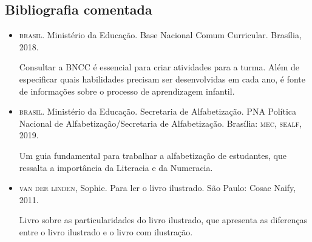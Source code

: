 \documentclass[11pt]{extarticle}
\begin{document}
\subsection{Bibliografia comentada}

\begin{itemize}
\item \textsc{brasil}. Ministério da Educação. Base Nacional Comum Curricular. Brasília, 2018.

Consultar a \textsc{BNCC} é essencial para criar atividades para a turma. Além de especificar 
quais habilidades precisam ser desenvolvidas em cada ano, é fonte de informações sobre 
o processo de aprendizagem infantil. 
 
\item \textsc{brasil}. Ministério da Educação. Secretaria de Alfabetização. PNA Política Nacional de Alfabetização/Secretaria 
de Alfabetização. Brasília: \textsc{mec, sealf}, 2019.

Um guia fundamental para trabalhar a alfabetização de estudantes, que ressalta a importância da Literacia e da Numeracia. 

\item \textsc{van der linden}, Sophie. Para ler o livro ilustrado. São Paulo: Cosac Naify, 2011.

Livro sobre as particularidades do livro ilustrado, que apresenta as diferenças entre o livro ilustrado e o livro com ilustração. 
\end{itemize}
\end{document}
